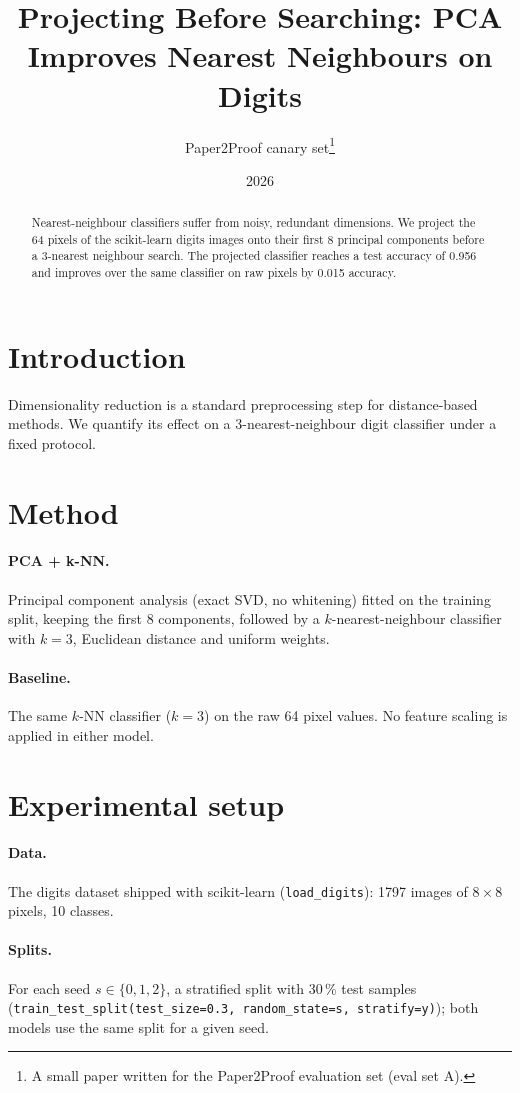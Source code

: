 \documentclass[11pt]{article}
\title{Projecting Before Searching: PCA Improves Nearest Neighbours on Digits}
\author{Paper2Proof canary set\thanks{A small paper written for the Paper2Proof evaluation set (eval set A).}}
\date{2026}
\begin{document}
\maketitle

\begin{abstract}
Nearest-neighbour classifiers suffer from noisy, redundant dimensions. We project the 64 pixels
of the scikit-learn digits images onto their first 8 principal components before a 3-nearest
neighbour search. The projected classifier reaches a test accuracy of 0.956 and improves over
the same classifier on raw pixels by 0.015 accuracy.
\end{abstract}

\section{Introduction}
Dimensionality reduction is a standard preprocessing step for distance-based methods. We
quantify its effect on a 3-nearest-neighbour digit classifier under a fixed protocol.

\section{Method}
\paragraph{PCA + k-NN.} Principal component analysis (exact SVD, no whitening) fitted on the
training split, keeping the first 8 components, followed by a $k$-nearest-neighbour classifier
with $k = 3$, Euclidean distance and uniform weights.
\paragraph{Baseline.} The same $k$-NN classifier ($k = 3$) on the raw 64 pixel values.
No feature scaling is applied in either model.

\section{Experimental setup}
\paragraph{Data.} The digits dataset shipped with scikit-learn (\texttt{load\_digits}): 1797
images of $8 \times 8$ pixels, 10 classes.
\paragraph{Splits.} For each seed $s \in \{0, 1, 2\}$, a stratified split with 30\,\% test
samples (\texttt{train\_test\_split(test\_size=0.3, random\_state=s, stratify=y)}); both models
use the same split for a given seed.
\end{document}
